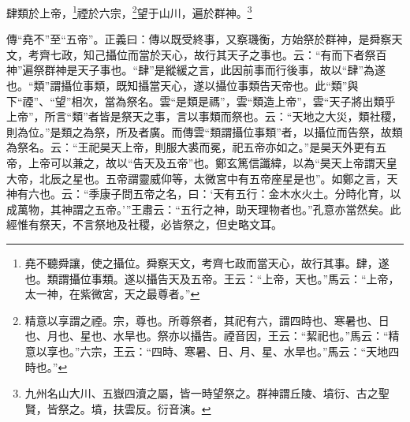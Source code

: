 肆類於上帝，\footnote{堯不聽舜讓，使之攝位。舜察天文，考齊七政而當天心，故行其事。肆，遂也。類謂攝位事類。遂以攝告天及五帝。王云：“上帝，天也。”馬云：“上帝，太一神，在紫微宮，天之最尊者。”}禋於六宗，\footnote{精意以享謂之禋。宗，尊也。所尊祭者，其祀有六，謂四時也、寒暑也、日也、月也、星也、水旱也。祭亦以攝告。禋音因，王云：“絜祀也。”馬云：“精意以享也。”六宗，王云：“四時、寒暑、日、月、星、水旱也。”馬云：“天地四時也。”}望于山川，遍於群神。\footnote{九州名山大川、五嶽四瀆之屬，皆一時望祭之。群神謂丘陵、墳衍、古之聖賢，皆祭之。墳，扶雲反。衍音演。}

{\noindent\zhuan{}\fzbyks 傳“堯不”至“五帝”。正義曰：傳以既受終事，又察璣衡，方始祭於群神，是舜察天文，考齊七政，知己攝位而當於天心，故行其天子之事也。云：“有而下者祭百神”遍祭群神是天子事也。“肆”是縱緩之言，此因前事而行後事，故以“肆”為遂也。“類”謂攝位事類，既知攝當天心，遂以攝位事類告天帝也。此“類”與下“禋”、“望”相次，當為祭名。雲“是類是禡”，雲“類造上帝”，雲“天子將出類乎上帝”，所言“類”者皆是祭天之事，言以事類而祭也。云：“天地之大災，類社稷，則為位。”是類之為祭，所及者廣。而傳雲“類謂攝位事類”者，以攝位而告祭，故類為祭名。云：“王祀昊天上帝，則服大裘而冕，祀五帝亦如之。”是昊天外更有五帝，上帝可以兼之，故以“告天及五帝”也。鄭玄篤信讖緯，以為“昊天上帝謂天皇大帝，北辰之星也。五帝謂靈威仰等，太微宮中有五帝座星是也”。如鄭之言，天神有六也。云：“季康子問五帝之名，曰：‘天有五行：金木水火土。分時化育，以成萬物，其神謂之五帝。’”王肅云：“五行之神，助天理物者也。”孔意亦當然矣。此經惟有祭天，不言祭地及社稷，必皆祭之，但史略文耳。 \par}

